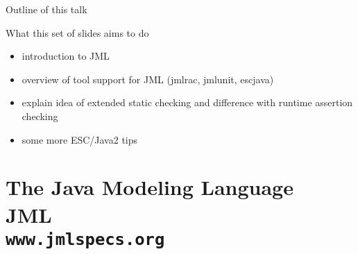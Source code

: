 \documentclass[
pdf,
nocolorBG,
slideColor,
erik,
]{prosper}
\title{\embf{\blue 
       {\huge Introduction to JML
      }}}
\author{\embf{\Large{\red Erik Poll}}
       }
\newif\ifignore
\begin{document}
\maketitle 

\boldmath

\ifignore
\begin{slide}{Test \hfill}

{\Large Large}
{\large large}
{\normalsize normal}
niks
{\small small}
{\footnotesize footnote}
{\scriptsize script}
{\tiny tiny}

{\bf bf}
{\rm rm}
{\it it}
{\sf sf}
{\sc sc}

\textit{textit}
\textrm{textrm}
\textbf{textbf}
\textsf{textsf}
\textsc{textsc}

\end{slide}
\fi


\begin{slide}{Outline of this talk}
\vspace*{-2ex}

What this set of slides aims to do
\begin{itemize}
\item introduction to JML
\item overview of tool support for JML (jmlrac, jmlunit, escjava)
\item explain idea of extended static checking and difference with runtime assertion checking
\item some more ESC/Java2 tips
\end{itemize}


\end{slide}


\part{{\Large \red The Java Modeling Language \\ JML \\[2ex] {\large\black \texttt{www.jmlspecs.org}}}}
\end{document}
